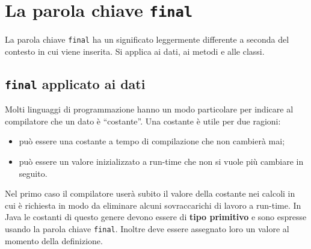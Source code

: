 \documentclass[12pt]{report}
\begin{document}
\section{La parola chiave \texttt{final}}
La parola chiave \texttt{final} ha un significato leggermente differente a seconda del contesto in cui viene inserita. Si applica ai dati, ai metodi e alle classi.
\subsection{\texttt{final} applicato ai dati}
Molti linguaggi di programmazione hanno un modo particolare per indicare al compilatore che un dato è ``costante''. Una costante è utile per due ragioni:
\begin{itemize}
	\item può essere una costante a tempo di compilazione che non cambierà mai;
	\item può essere un valore inizializzato a run-time che non si vuole più cambiare in seguito.
\end{itemize}
Nel primo caso il compilatore userà subito il valore della costante nei calcoli in cui è richiesta in modo da eliminare alcuni sovraccarichi di lavoro a run-time. In Java le costanti di questo genere devono essere di \textbf{tipo primitivo} e sono espresse usando la parola chiave \texttt{final}. Inoltre deve essere assegnato loro un valore al momento della definizione.
\end{document}
